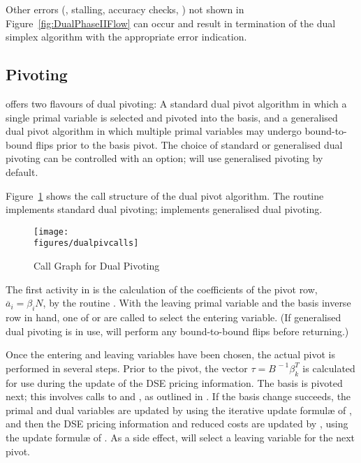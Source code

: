 Other errors (\eg, stalling, accuracy checks, \etc) not shown in
Figure~\ref{fig:DualPhaseIIFlow} can occur and result in termination of the
dual simplex algorithm with the appropriate error indication.

\subsection{Pivoting}
\label{sec:DualPivoting}

\dylp offers two flavours of dual pivoting: A standard dual pivot algorithm in
which a single primal variable is selected and pivoted into the basis, and a
generalised dual pivot algorithm \cite[\S10.2]{Mar03} in which multiple primal
variables may undergo bound-to-bound flips prior to the basis pivot.
The choice of standard or generalised dual pivoting can be controlled with an
option; \dylp will use generalised pivoting by default.

Figure~\ref{fig:DualPivotCallGraph} shows the call structure of the dual
pivot algorithm.
The routine  implements standard dual pivoting;
 implements generalised dual pivoting.

\begin{figure}[htb]
\centering
\texttt{[image: \\figures/dualpivcalls]}
\caption{Call Graph for Dual Pivoting} \label{fig:DualPivotCallGraph}
\end{figure}

The first activity in  is the calculation of the
coefficients of the pivot row, $\overline{a}_{i} = \beta_i N$, by the routine
.
With the leaving primal variable and the basis inverse row in hand, one of
 or  are called to select the entering
variable.
(If generalised dual pivoting is in use,  will perform
any bound-to-bound flips before returning.)

Once the entering and leaving variables have been chosen, the actual pivot
is performed in several steps.
Prior to the pivot, the vector $\tau = B^{\,-1}\beta^T_k$ is calculated for
use during the update of the DSE pricing information.
The basis is pivoted next; this involves calls to  and
, as outlined in .
If the basis change succeeds, the primal and dual variables are updated by
 using the iterative update formul\ae{} of
, and then the DSE pricing information
and reduced
costs are updated by , using the update formul\ae{} of
.
As a side effect,  will select a leaving variable for the
next pivot.

